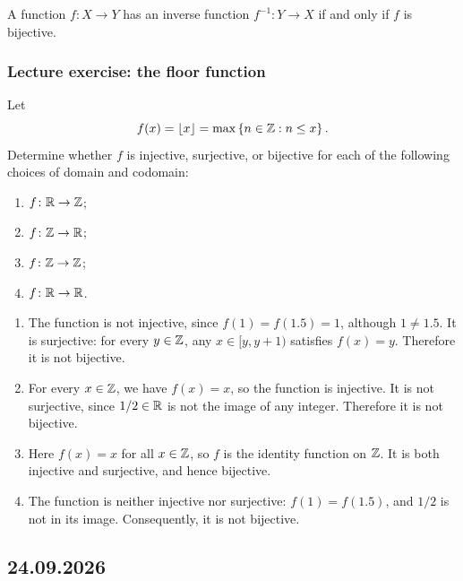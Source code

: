 \documentclass[11pt,a4paper]{amsart}
\begin{document}
\begin{theorem}
  A function \(f\colon X \to Y\) has an inverse function
  \(f^{-1}\colon Y \to X\) if and only if \(f\) is bijective.
\end{theorem}

\subsubsection{Lecture exercise: the floor function}

\begin{problem}
  Let
  \[
    f(x) = \lfloor x \rfloor
    = \max\left\lbrace n \in \mathbb{Z} : n \leq x\right\rbrace.
  \]
  Determine whether \(f\) is injective, surjective, or bijective for each
  of the following choices of domain and codomain:
  \begin{enumerate}[label=(\alph*)]
    \item \(f\colon \mathbb{R} \to \mathbb{Z}\);
    \item \(f\colon \mathbb{Z} \to \mathbb{R}\);
    \item \(f\colon \mathbb{Z} \to \mathbb{Z}\);
    \item \(f\colon \mathbb{R} \to \mathbb{R}\).
  \end{enumerate}
\end{problem}

\begin{solution}
  \begin{enumerate}[label=(\alph*)]
    \item The function is not injective, since
      \(f(1)=f(1.5)=1\), although \(1 \neq 1.5\). It is surjective:
      for every \(y \in \mathbb{Z}\), any \(x \in [y,y+1)\) satisfies
      \(f(x)=y\). Therefore it is not bijective.
    \item For every \(x \in \mathbb{Z}\), we have \(f(x)=x\), so the function
      is injective. It is not surjective, since \(1/2 \in \mathbb{R}\) is not
      the image of any integer. Therefore it is not bijective.
    \item Here \(f(x)=x\) for all \(x \in \mathbb{Z}\), so \(f\) is the
      identity function on \(\mathbb{Z}\). It is both injective and
      surjective, and hence bijective.
    \item The function is neither injective nor surjective:
      \(f(1)=f(1.5)\), and \(1/2\) is not in its image.
      Consequently, it is not bijective. \qedhere
  \end{enumerate}
\end{solution}

\subsection{24.09.2026}
\end{document}

